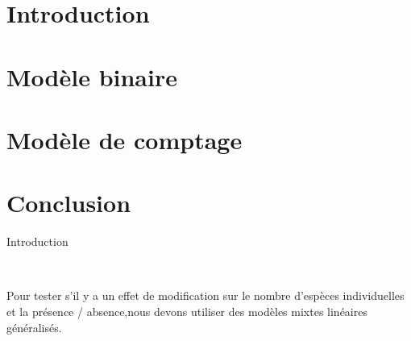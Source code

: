 \documentclass[unknownkeysallowed]{beamer}
\begin{document}
\section{Introduction}
\label{sec:motiv}
\section{Modèle binaire}
\label{sec:motiv}
\section{Modèle de comptage}
\label{sec:motiv}
\section{Conclusion}
\label{sec:motiv}
\begin{frame}{Introduction}
\begin{itemize}\setlength{\itemsep}{5pt}

\\

\end{itemize}
\end{frame}


\begin{frame}{}

Pour tester s'il y a un effet de modification sur le nombre d'espèces individuelles et la présence / absence,nous devons utiliser des modèles mixtes linéaires généralisés.

\end{frame}
\end{document}
